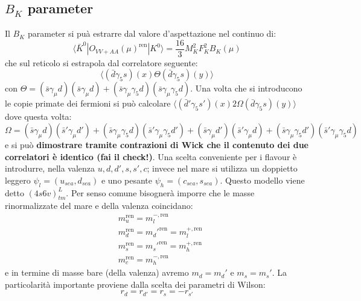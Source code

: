 \documentclass[12pt,a4paper,openright]{article}
\newcommand{\la}{\langle}
\newcommand{\ra}{\rangle}
\newcommand{\colg}{\textcolor{PineGreen}}
\newcommand{\ren}{{\text{ren}}}
\begin{document}
\subsection{$B_K$ parameter}
Il $B_K$ parameter si puà estrarre dal valore d'aspettazione nel continuo di:
\begin{equation*}
  \la \bar K^0 | O_{VV+AA}(\mu)^\ren | K^0 \ra = \frac{16}{3}M_K^2 F_K^2 B_K (\mu)
\end{equation*}
che sul reticolo si estrapola dal correlatore seguente:
\begin{equation}\label{eq:correlator-for-BK}
  \la (\bar d \gamma_5 s)(x) \Theta (\bar d \gamma_5 s)(y)  \ra
\end{equation}
con $\Theta = (\bar s \gamma_\mu d)(\bar s \gamma_\mu d)+(\bar s \gamma_\mu\gamma_5 d)(\bar s \gamma_\mu\gamma_5 d)$.
Una volta che si introducono le copie primate dei fermioni si può calcolare $\la (\bar d' \gamma_5 s')(x) 2\Omega (\bar d \gamma_5 s)(y) \ra$
dove questa volta:
\begin{equation*}
  \Omega = (\bar s \gamma_\mu d)(\bar s' \gamma_\mu d')+(\bar s \gamma_\mu\gamma_5 d)(\bar s' \gamma_\mu\gamma_5 d')
  +(\bar s \gamma_\mu d')(\bar s' \gamma_\mu d)+(\bar s \gamma_\mu\gamma_5 d')(\bar s' \gamma_\mu\gamma_5 d)
\end{equation*}
e si può {\bf \colg{dimostrare tramite contrazioni di Wick che il contenuto dei due correlatori è identico (fai il check!)}}.
\newline
\newline
Una scelta conveniente per i flavour è introdurre, nella valenza $u,d,d',s,s',c$;
invece nel mare si utilizza un doppietto leggero $\psi_l = (u_{sea}, d_{sea})$ e uno pesante $\psi_h = (c_{sea}, s_{sea})$.
Questo modello viene detto $(4s6v)_{tm}^L$.
Per senso comune bisognerà imporre che le masse rinormalizzate del mare e della valenza coincidano:
\begin{equation*}
  \begin{aligned}
    & m_u^\ren = m_l^{-,\ren}\\
    & m_d^\ren = m_d'^\ren = m_l^{+,\ren} \\
    & m_s^\ren = m_s'^\ren = m_h^{+,\ren} \\
    & m_c^\ren = m_h^{-,\ren}
  \end{aligned}
\end{equation*}
e in termine di masse bare (della valenza) avremo $m_d = m_d'$ e $m_s = m_s'$.
La particolarità importante proviene dalla scelta dei parametri di Wilson:
\begin{equation*}
  r_d = r_{d'} = r_s = - r_{s'}
\end{equation*}
\end{document}

